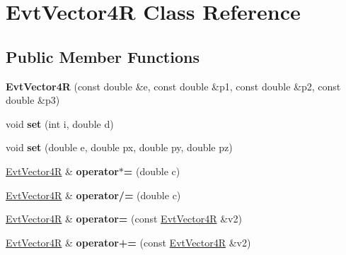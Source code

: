 \hypertarget{class_evt_vector4_r}{}\section{Evt\+Vector4\+R Class Reference}
\label{class_evt_vector4_r}
\subsection*{Public Member Functions}
\begin{DoxyCompactItemize}
\item 
\hypertarget{class_evt_vector4_r_a3fbc5bcc383a8e4b6b5de8a0441caaa5}{}{\bfseries Evt\+Vector4\+R} (const double \&e, const double \&p1, const double \&p2, const double \&p3)\label{class_evt_vector4_r_a3fbc5bcc383a8e4b6b5de8a0441caaa5}

\item 
\hypertarget{class_evt_vector4_r_adfe773ff1f77d8975be185e9f89199ce}{}void {\bfseries set} (int i, double d)\label{class_evt_vector4_r_adfe773ff1f77d8975be185e9f89199ce}

\item 
\hypertarget{class_evt_vector4_r_a00a386eaa4f794504dca7742d9f82a47}{}void {\bfseries set} (double e, double px, double py, double pz)\label{class_evt_vector4_r_a00a386eaa4f794504dca7742d9f82a47}

\item 
\hypertarget{class_evt_vector4_r_aa42cd69aa01ae83f13b4d11423a825a9}{}\hyperlink{class_evt_vector4_r}{Evt\+Vector4\+R} \& {\bfseries operator$\ast$=} (double c)\label{class_evt_vector4_r_aa42cd69aa01ae83f13b4d11423a825a9}

\item 
\hypertarget{class_evt_vector4_r_abb8e46fac5cd6ce1451ac1b26b3ffbaf}{}\hyperlink{class_evt_vector4_r}{Evt\+Vector4\+R} \& {\bfseries operator/=} (double c)\label{class_evt_vector4_r_abb8e46fac5cd6ce1451ac1b26b3ffbaf}

\item 
\hypertarget{class_evt_vector4_r_a54daef0fee186f8db3ab92f01cf3afea}{}\hyperlink{class_evt_vector4_r}{Evt\+Vector4\+R} \& {\bfseries operator=} (const \hyperlink{class_evt_vector4_r}{Evt\+Vector4\+R} \&v2)\label{class_evt_vector4_r_a54daef0fee186f8db3ab92f01cf3afea}

\item 
\hypertarget{class_evt_vector4_r_a70fe031839ba6d152efea89c1b118968}{}\hyperlink{class_evt_vector4_r}{Evt\+Vector4\+R} \& {\bfseries operator+=} (const \hyperlink{class_evt_vector4_r}{Evt\+Vector4\+R} \&v2)\label{class_evt_vector4_r_a70fe031839ba6d152efea89c1b118968}


\end{DoxyCompactItemize}
